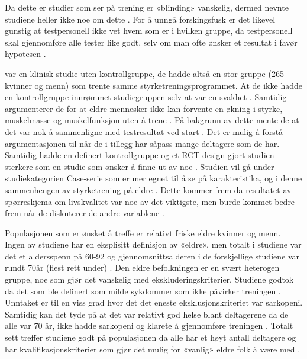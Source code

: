 \documentclass[
]{book}
\begin{document}
Da dette er studier som ser på trening er «blinding» vanskelig, dermed nevnte studiene heller ikke noe om dette \citep{geirsdottir2012, schott2019, turpela2017, vikberg2019, vincent2002}. For å unngå forskingsfusk er det likevel gunstig at testpersonell ikke vet hvem som er i hvilken gruppe, da testpersonell skal gjennomføre alle tester like godt, selv om man ofte ønsker et resultat i favør hypotesen \citep[s. 148-149]{hulley2013}.

\citet{geirsdottir2012} var en klinisk studie uten kontrollgruppe, de hadde altså en stor gruppe (265 kvinner og menn) som trente samme styrketreningsprogrammet. At de ikke hadde en kontrollgruppe innrømmet studiegruppen selv at var en svakhet \citep{geirsdottir2012}. Samtidig argumenterer de for at eldre mennesker ikke kan forvente en økning i styrke, muskelmasse og muskelfunksjon uten å trene \citep{geirsdottir2012} . På bakgrunn av dette mente de at det var nok å sammenligne med testresultat ved start \citep{geirsdottir2012}. Det er mulig å forstå argumentasjonen til \citet{geirsdottir2012} når de i tillegg har såpass mange deltagere som de har. Samtidig hadde en definert kontrollgruppe og et RCT-design gjort studien sterkere som en studie som ønsker å finne ut av noe \citep[s. 87]{hulley2013}. Studien vil gå under studiekategorien Case-serie som er mer egnet til å se på karakteristika, og i denne sammenhengen av styrketrening på eldre \citep[s. 87]{hulley2013}. Dette kommer frem da resultatet av spørreskjema om livskvalitet var noe av det viktigste, men burde kommet bedre frem når de diskuterer de andre variablene \citep{geirsdottir2012}.

Populasjonen som er ønsket å treffe er relativt friske eldre kvinner og menn\citep{geirsdottir2012, schott2019, turpela2017, vikberg2019, vincent2002}. Ingen av studiene har en eksplisitt definisjon av «eldre», men totalt i studiene var det et aldersspenn på 60-92 og gjennomsnittsalderen i de forskjellige studiene var rundt 70år (flest rett under) \citep{geirsdottir2012, schott2019, turpela2017, vikberg2019, vincent2002}. Den eldre befolkningen er en svært heterogen gruppe, noe som gjør det vanskelig med ekskluderingskriterier. Studiene godtok da det som ble definert som milde sykdommer som ikke påvirker treningen \citep{geirsdottir2012, schott2019, turpela2017, vincent2002}. Unntaket er til en viss grad \citet{vikberg2019} hvor det det eneste eksklusjonskriteriet var sarkopeni. Samtidig kan det tyde på at det var relativt god helse blant deltagerene da de alle var 70 år, ikke hadde sarkopeni og klarete å gjennomføre treningen \citep{vikberg2019}. Totalt sett treffer studiene godt på populasjonen da alle har et høyt antall deltagere og har kvalifikasjonskriterier som gjør det mulig for «vanlig» eldre folk å være med \citep{geirsdottir2012, schott2019, turpela2017, vikberg2019, vincent2002}.
\end{document}
